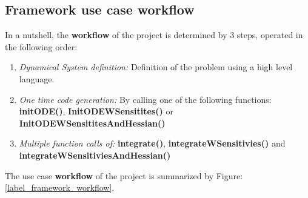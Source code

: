 \documentclass[12pt, letterpaper]{article}
\begin{document}
\subsection{Framework use case workflow}
\label{label_UseCaseWorkflow}

In a nutshell, the \textbf{workflow} of the project is determined by 3 steps, operated in the following order:

\begin{enumerate}
	\item \textit{Dynamical System definition:} Definition of the problem using a high level language.
	\item \textit{One time code generation:} By calling one of the following functions: \textbf{initODE()}, \textbf{InitODEWSensitites()} or \textbf{ InitODEWSensititesAndHessian()}
	\item \textit{Multiple function calls of:} \textbf{integrate()}, \textbf{integrateWSensitivies()} and \textbf{integrateWSensitiviesAndHessian()}
\end{enumerate}

  

The use case \textbf{workflow} of the project is summarized by Figure:\ref{label_framework_workflow}.
\\
\\
\end{document}
